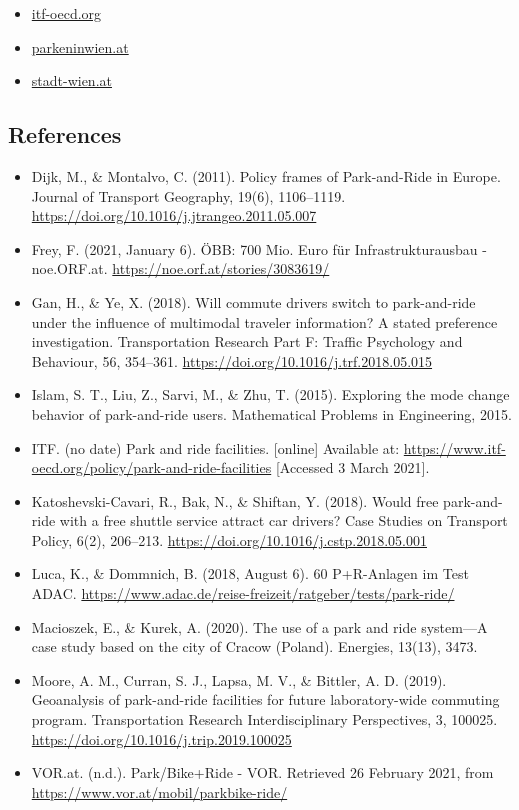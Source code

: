 \documentclass[
]{book}
\providecommand{\tightlist}{%
  \setlength{\itemsep}{0pt}\setlength{\parskip}{0pt}}
\begin{document}
\begin{itemize}
\tightlist
\item
  \href{https://www.itf-oecd.org/policy/park-and-ride-facilities}{itf-oecd.org}
\item
  \href{http://www.parkeninwien.at/en/Park-and-Ride.html}{parkeninwien.at}
\item
  \href{https://www.stadt-wien.at/wien/parken-in-wien/park-ride-parkhaeuser-im-ueberblick.html}{stadt-wien.at}
\end{itemize}

\hypertarget{references-17}{%
\subsection*{References}\label{references-17}}

\begin{itemize}
\tightlist
\item
  Dijk, M., \& Montalvo, C. (2011). Policy frames of Park-and-Ride in Europe. Journal of Transport Geography, 19(6), 1106--1119. \url{https://doi.org/10.1016/j.jtrangeo.2011.05.007}
\item
  Frey, F. (2021, January 6). ÖBB: 700 Mio. Euro für Infrastrukturausbau - noe.ORF.at. \url{https://noe.orf.at/stories/3083619/}
\item
  Gan, H., \& Ye, X. (2018). Will commute drivers switch to park-and-ride under the influence of multimodal traveler information? A stated preference investigation. Transportation Research Part F: Traffic Psychology and Behaviour, 56, 354--361. \url{https://doi.org/10.1016/j.trf.2018.05.015}
\item
  Islam, S. T., Liu, Z., Sarvi, M., \& Zhu, T. (2015). Exploring the mode change behavior of park-and-ride users. Mathematical Problems in Engineering, 2015.
\item
  ITF. (no date) Park and ride facilities. {[}online{]} Available at: \url{https://www.itf-oecd.org/policy/park-and-ride-facilities} {[}Accessed 3 March 2021{]}.
\item
  Katoshevski-Cavari, R., Bak, N., \& Shiftan, Y. (2018). Would free park-and-ride with a free shuttle service attract car drivers? Case Studies on Transport Policy, 6(2), 206--213. \url{https://doi.org/10.1016/j.cstp.2018.05.001}
\item
  Luca, K., \& Dommnich, B. (2018, August 6). 60 P+R-Anlagen im Test \textbar{} ADAC. \url{https://www.adac.de/reise-freizeit/ratgeber/tests/park-ride/}
\item
  Macioszek, E., \& Kurek, A. (2020). The use of a park and ride system---A case study based on the city of Cracow (Poland). Energies, 13(13), 3473.
\item
  Moore, A. M., Curran, S. J., Lapsa, M. V., \& Bittler, A. D. (2019). Geoanalysis of park-and-ride facilities for future laboratory-wide commuting program. Transportation Research Interdisciplinary Perspectives, 3, 100025. \url{https://doi.org/10.1016/j.trip.2019.100025}
\item
  VOR.at. (n.d.). Park/Bike+Ride - VOR. Retrieved 26 February 2021, from \url{https://www.vor.at/mobil/parkbike-ride/}
\end{itemize}
\end{document}
